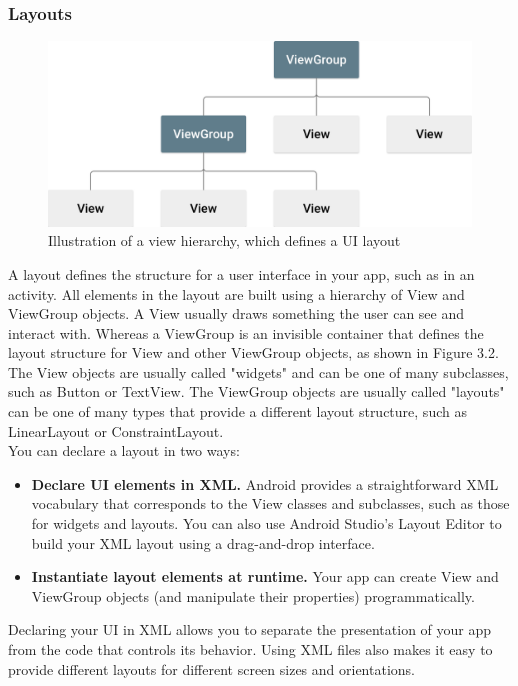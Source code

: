 \documentclass[14pt]{report}
\begin{document}
					\subsubsection{Layouts}
					\begin{figure}[b]
						\includegraphics[width=12cm]{ViewGroup.png}
						\centering
						\caption{Illustration of a view hierarchy, which defines a UI layout}
					\end{figure}
					A layout defines the structure for a user interface in your app, such as in an activity. All elements in the layout are built using a hierarchy of View and ViewGroup objects. A View usually draws something the user can see and interact with. Whereas a ViewGroup is an invisible container that defines the layout structure for View and other ViewGroup objects, as shown in Figure 3.2.\\

					The View objects are usually called "widgets" and can be one of many subclasses, such as Button or TextView. The ViewGroup objects are usually called "layouts" can be one of many types that provide a different layout structure, such as LinearLayout or ConstraintLayout.\\

					You can declare a layout in two ways:
					\begin{itemize}
						\item \textbf{Declare UI elements in XML.} Android provides a straightforward XML vocabulary that corresponds to the View classes and subclasses, such as those for widgets and layouts. You can also use Android Studio's Layout Editor to build your XML layout using a drag-and-drop interface.
						\item \textbf{Instantiate layout elements at runtime.} Your app can create View and ViewGroup objects (and manipulate their properties) programmatically.
					\end{itemize}

					Declaring your UI in XML allows you to separate the presentation of your app from the code that controls its behavior. Using XML files also makes it easy to provide different layouts for different screen sizes and orientations.\\
\end{document}
